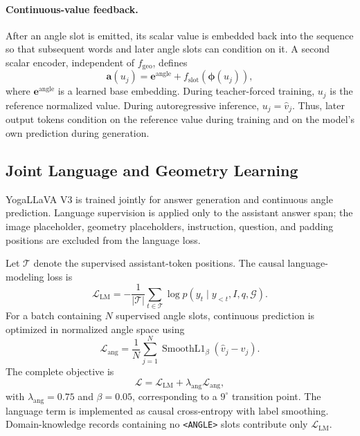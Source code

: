 \paragraph{Continuous-value feedback.}
After an angle slot is emitted, its scalar value is embedded back into
the sequence so that subsequent words and later angle slots can
condition on it. A second scalar encoder, independent of
$f_{\mathrm{geo}}$, defines
\begin{equation}
    \mathbf{a}(u_j)
    =
    \mathbf{e}^{\mathrm{angle}}
    +
    f_{\mathrm{slot}}
    \left(
        \boldsymbol{\phi}(u_j)
    \right),
    \label{eq:angle_feedback}
\end{equation}
where $\mathbf{e}^{\mathrm{angle}}$ is a learned base embedding. During
teacher-forced training, $u_j$ is the reference normalized value.
During autoregressive inference, $u_j=\widehat{v}_j$. Thus, later output
tokens condition on the reference value during training and on the
model's own prediction during generation.

\subsection{Joint Language and Geometry Learning}
\label{sec:training_objective}

YogaLLaVA V3 is trained jointly for answer generation and continuous
angle prediction. Language supervision is applied only to the assistant
answer span; the image placeholder, geometry placeholders, instruction,
question, and padding positions are excluded from the language loss.

Let $\mathcal{T}$ denote the supervised assistant-token positions. The
causal language-modeling loss is
\begin{equation}
    \mathcal{L}_{\mathrm{LM}}
    =
    -\frac{1}{|\mathcal{T}|}
    \sum_{t\in\mathcal{T}}
    \log
    p
    \left(
        y_t
        \mid
        y_{<t},I,q,\mathcal{G}
    \right).
    \label{eq:language_loss}
\end{equation}
For a batch containing $N$ supervised angle slots, continuous prediction
is optimized in normalized angle space using
\begin{equation}
    \mathcal{L}_{\mathrm{ang}}
    =
    \frac{1}{N}
    \sum_{j=1}^{N}
    \operatorname{SmoothL1}_{\beta}
    \left(
        \widehat{v}_j-v_j
    \right).
    \label{eq:regression_loss}
\end{equation}
The complete objective is
\begin{equation}
    \mathcal{L}
    =
    \mathcal{L}_{\mathrm{LM}}
    +
    \lambda_{\mathrm{ang}}
    \mathcal{L}_{\mathrm{ang}},
    \label{eq:total_loss}
\end{equation}
with $\lambda_{\mathrm{ang}}=0.75$ and $\beta=0.05$, corresponding to a
$9^\circ$ transition point. The language term is implemented as causal
cross-entropy with label smoothing. Domain-knowledge records containing
no \texttt{<ANGLE>} slots contribute only
$\mathcal{L}_{\mathrm{LM}}$.

